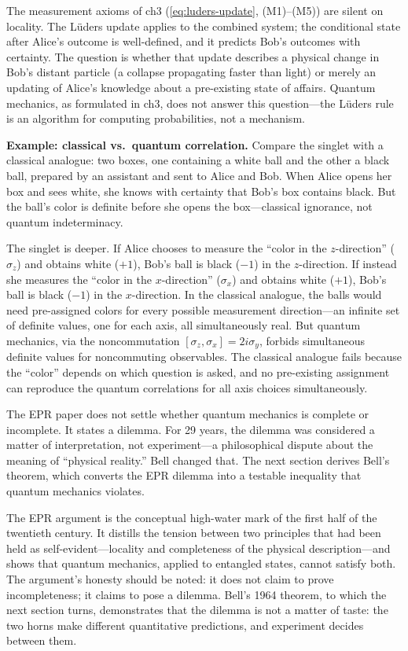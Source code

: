 The measurement axioms of ch3 (\eqref{eq:luders-update}, (M1)--(M5)) are silent on locality. The L\"uders update applies to the combined system; the conditional state after Alice's outcome is well-defined, and it predicts Bob's outcomes with certainty. The question is whether that update describes a physical change in Bob's distant particle (a collapse propagating faster than light) or merely an updating of Alice's knowledge about a pre-existing state of affairs. Quantum mechanics, as formulated in ch3, does not answer this question---the L\"uders rule is an algorithm for computing probabilities, not a mechanism.

\medskip\noindent\textbf{Example: classical vs.\ quantum correlation.}
Compare the singlet with a classical analogue: two boxes, one containing a white ball and the other a black ball, prepared by an assistant and sent to Alice and Bob. When Alice opens her box and sees white, she knows with certainty that Bob's box contains black. But the ball's color is definite before she opens the box---classical ignorance, not quantum indeterminacy.

The singlet is deeper. If Alice chooses to measure the ``color in the $z$-direction'' ($\sigma_z$) and obtains white ($+1$), Bob's ball is black ($-1$) in the $z$-direction. If instead she measures the ``color in the $x$-direction'' ($\sigma_x$) and obtains white ($+1$), Bob's ball is black ($-1$) in the $x$-direction. In the classical analogue, the balls would need pre-assigned colors for every possible measurement direction---an infinite set of definite values, one for each axis, all simultaneously real. But quantum mechanics, via the noncommutation $[\sigma_z, \sigma_x] = 2i\sigma_y$, forbids simultaneous definite values for noncommuting observables. The classical analogue fails because the ``color'' depends on which question is asked, and no pre-existing assignment can reproduce the quantum correlations for all axis choices simultaneously.

\begin{note}
The EPR paper does not settle whether quantum mechanics is complete or incomplete. It states a dilemma. For 29 years, the dilemma was considered a matter of interpretation, not experiment---a philosophical dispute about the meaning of ``physical reality.'' Bell changed that. The next section derives Bell's theorem, which converts the EPR dilemma into a testable inequality that quantum mechanics violates.
\end{note}

The EPR argument is the conceptual high-water mark of the first half of the twentieth century. It distills the tension between two principles that had been held as self-evident---locality and completeness of the physical description---and shows that quantum mechanics, applied to entangled states, cannot satisfy both. The argument's honesty should be noted: it does not claim to prove incompleteness; it claims to pose a dilemma. Bell's 1964 theorem, to which the next section turns, demonstrates that the dilemma is not a matter of taste: the two horns make different quantitative predictions, and experiment decides between them.
